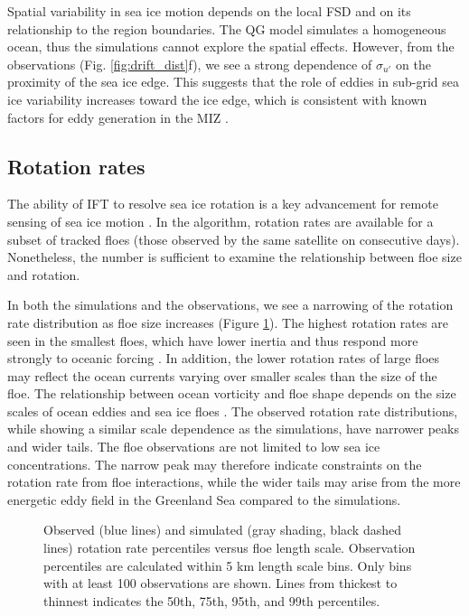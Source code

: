 \documentclass[aog]{igs}
\begin{document}
Spatial variability in sea ice motion depends on the local FSD and on its relationship to the region boundaries. 
The QG model simulates a homogeneous ocean, thus the simulations cannot explore the spatial effects. 
However, from the observations (Fig. \ref{fig:drift_dist}f), we see a strong dependence of $\sigma_{u'}$ on the proximity of the sea ice edge. 
This suggests that the role of eddies in sub-grid sea ice variability increases toward the ice edge, which is consistent with known factors for eddy generation in the MIZ \citep{kozlov2021_EddiesMarginal, piccolo2024_EnergeticsTransfer}.

\subsection{Rotation rates}
The ability of IFT to resolve sea ice rotation is a key advancement for remote sensing of sea ice motion \cite{lopez-acostaSeaIceDrift2021, manucharyan2022_SpinningIce}. In the algorithm, rotation rates are available for a subset of tracked floes (those observed by the same satellite on consecutive days). Nonetheless, the number is sufficient to examine the relationship between floe size and rotation.

In both the simulations and the observations, we see a narrowing of the rotation rate distribution as floe size increases (Figure \ref{fig05_rotation}). 
The highest rotation rates are seen in the smallest floes, which have lower inertia and thus respond more strongly to oceanic forcing \cite{manucharyan2022_SpinningIce, kim2024_CharacterizationSea}. In addition, the lower rotation rates of large floes may reflect the ocean currents varying over smaller scales than the size of the floe. The relationship between ocean vorticity and floe shape depends on the size scales of ocean eddies and sea ice floes \citep{kim2024_CharacterizationSea}. 
The observed rotation rate distributions, while showing a similar scale dependence as the simulations, have narrower peaks and wider tails. The floe observations are not limited to low sea ice concentrations. The narrow peak may therefore indicate constraints on the rotation rate from floe interactions, while the wider tails may arise from the more energetic eddy field in the Greenland Sea compared to the simulations. 

\begin{figure}
\caption{Observed (blue lines) and simulated (gray shading, black dashed lines) rotation rate percentiles versus floe length scale. Observation percentiles are calculated within 5 km length scale bins. Only bins with at least 100 observations are shown. Lines from thickest to thinnest indicates the 50th, 75th, 95th, and 99th percentiles.}
\label{fig05_rotation}
\end{figure}
\end{document}
